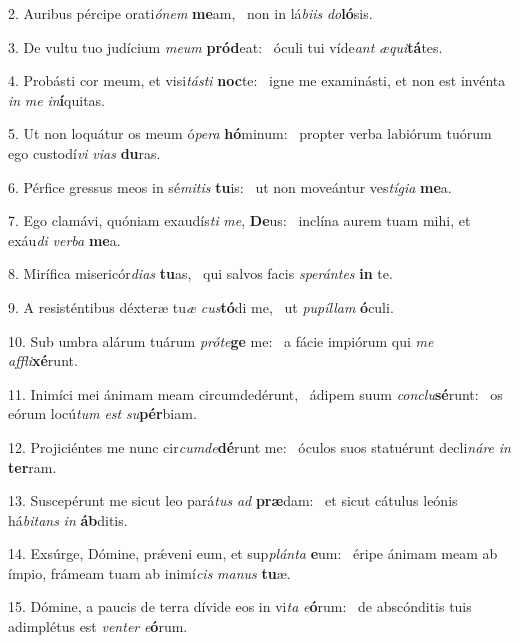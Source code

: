 2. Auribus pércipe orati\textit{ó}\textit{nem} \textbf{me}am, \ast\  non in lá\textit{bi}\textit{is} \textit{do}\textbf{ló}sis.\

3. De vultu tuo judícium \textit{me}\textit{um} \textbf{pród}eat: \ast\  óculi tui víde\textit{ant} \textit{æ}\textit{qui}\textbf{tá}tes.\

4. Probásti cor meum, et visi\textit{tás}\textit{ti} \textbf{noc}te: \ast\  igne me examinásti, et non est invénta \textit{in} \textit{me} \textit{in}\textbf{í}quitas.\

5. Ut non loquátur os meum ó\textit{pe}\textit{ra} \textbf{hó}minum: \ast\  propter verba labiórum tuórum ego custodí\textit{vi} \textit{vi}\textit{as} \textbf{du}ras.\

6. Pérfice gressus meos in sé\textit{mi}\textit{tis} \textbf{tu}is: \ast\  ut non moveántur ves\textit{tí}\textit{gi}\textit{a} \textbf{me}a.\

7. Ego clamávi, quóniam exaudís\textit{ti} \textit{me}, \textbf{De}us: \ast\  inclína aurem tuam mihi, et exáu\textit{di} \textit{ver}\textit{ba} \textbf{me}a.\

8. Mirífica misericór\textit{di}\textit{as} \textbf{tu}as, \ast\  qui salvos facis \textit{spe}\textit{rán}\textit{tes} \textbf{in} te.\

9. A resisténtibus déxteræ tu\textit{æ} \textit{cus}\textbf{tó}di me, \ast\  ut \textit{pu}\textit{píl}\textit{lam} \textbf{ó}culi.\

10. Sub umbra alárum tuárum \textit{pró}\textit{te}\textbf{ge} me: \ast\  a fácie impiórum qui \textit{me} \textit{af}\textit{fli}\textbf{xé}runt.\

11. Inimíci mei ánimam meam circumdedérunt, \dag\  ádipem suum \textit{con}\textit{clu}\textbf{sé}runt: \ast\  os eórum locú\textit{tum} \textit{est} \textit{su}\textbf{pér}biam.\

12. Projiciéntes me nunc cir\textit{cum}\textit{de}\textbf{dé}runt me: \ast\  óculos suos statuérunt decli\textit{ná}\textit{re} \textit{in} \textbf{ter}ram.\

13. Suscepérunt me sicut leo pará\textit{tus} \textit{ad} \textbf{præ}dam: \ast\  et sicut cátulus leónis há\textit{bi}\textit{tans} \textit{in} \textbf{áb}ditis.\

14. Exsúrge, Dómine, prǽveni eum, et sup\textit{plán}\textit{ta} \textbf{e}um: \ast\  éripe ánimam meam ab ímpio, frámeam tuam ab inimí\textit{cis} \textit{ma}\textit{nus} \textbf{tu}æ.\

15. Dómine, a paucis de terra dívide eos in vi\textit{ta} \textit{e}\textbf{ó}rum: \ast\  de abscónditis tuis adimplétus est \textit{ven}\textit{ter} \textit{e}\textbf{ó}rum.\

